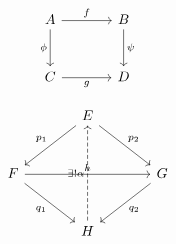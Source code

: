 \documentclass{article}
\begin{document}
	\[
	\begin{tikzcd}[row sep=large, column sep=large]
		A \arrow[r, "f"] \arrow[d, "\phi"'] 
		& B \arrow[d, "\psi"] \\
		C \arrow[r, "g"'] 
		& D
	\end{tikzcd}
	\]
	
	\[
	\begin{tikzcd}[row sep=large, column sep=large]
		& E \arrow[dl, "p_1"'] \arrow[dr, "p_2"] \\
		F \arrow[rr, "h"] \arrow[dr, "q_1"'] 
		&& G \arrow[dl, "q_2"] \\
		& H \arrow[uu, dashed, "\exists! \alpha"]
	\end{tikzcd}
	\]
\end{document}

